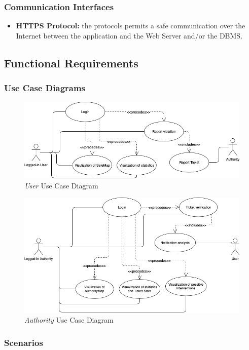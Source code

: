 \documentclass {article}
\begin{document}
	\subsubsection{Communication Interfaces}
	\begin{itemize}
		\item {\bf HTTPS Protocol:} the protocols permits a safe communication over the Internet between the application and the Web Server and/or the DBMS.
	\end{itemize}
	\subsection{Functional Requirements}
	\subsubsection{Use Case Diagrams}
	\begin{figure}[H]
				\centering
				\includegraphics[scale=0.5]{Images/Diagrams/UseCaseUser.png}
				\caption{{\it User} Use Case Diagram}
	\end{figure}
	\begin{figure}[H]
				\centering
				\includegraphics[scale=0.5]{Images/Diagrams/UseCaseAuthority.png}
				\caption{{\it Authority} Use Case Diagram}
	\end{figure}
	
	\subsubsection{Scenarios}
	
\end{document}

